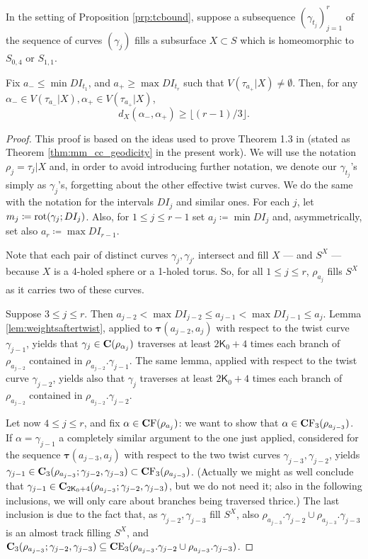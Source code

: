 \begin{lemma}\label{lem:tcboundsimplest}
In the setting of Proposition \ref{prp:tcbound}, suppose a subsequence $(\gamma_{t_j})_{j=1}^r$ of the sequence of curves $(\gamma_j)$ fills a subsurface $X\subset S$ which is homeomorphic to $S_{0,4}$ or $S_{1,1}$.

Fix $a_-\leq\min DI_{t_1}$, and $a_+\geq\max DI_{t_r}$ such that $V(\tau_{a_+}|X)\not=\emptyset$. Then, for any $\alpha_-\in V(\tau_{a_-}|X), \alpha_+\in V(\tau_{a_+}|X)$,
$$
d_X\left(\alpha_-,\alpha_+\right)\geq \lfloor (r-1)/3\rfloor.
$$
\end{lemma}
\begin{proof}
This proof is based on the ideas used to prove Theorem 1.3 in \cite{masurminskyq} (stated as Theorem \ref{thm:mm_cc_geodicity} in the present work). We will use the notation $\rho_j=\tau_j|X$ and, in order to avoid introducing further notation, we denote our $\gamma_{t_j}$'s simply as $\gamma_j$'s, forgetting about the other effective twist curves. We do the same with the notation for the intervals $DI_j$ and similar ones. For each $j$, let $m_j\coloneqq \mathrm{rot}(\gamma_j;DI_j)$. Also, for $1\leq j\leq r-1$ set $a_j\coloneqq\min DI_j$ and, asymmetrically, set also $a_r\coloneqq\max DI_{r-1}$.

Note that each pair of distinct curves $\gamma_j,\gamma_{j'}$ intersect and fill $X$ --- and $S^X$ --- because $X$ is a 4-holed sphere or a 1-holed torus. So, for all $1\leq j\leq r$, $\rho_{a_j}$ fills $S^X$ as it carries two of these curves.

Suppose $3\leq j \leq r$. Then $a_{j-2}<\max DI_{j-2}\leq a_{j-1}<\max DI_{j-1}\leq a_j$. Lemma \ref{lem:weightsaftertwist}, applied to $\bm\tau(a_{j-2},a_j)$ with respect to the twist curve $\gamma_{j-1}$, yields that $\gamma_j\in \mathbf C(\rho_{\alpha_j})$ traverses at least $2\mathsf{K}_0+4$ times each branch of $\rho_{a_{j-2}}$ contained in $\rho_{a_{j-2}}.\gamma_{j-1}$. The same lemma, applied with respect to the twist curve $\gamma_{j-2}$, yields also that $\gamma_j$ traverses at least $2\mathsf{K}_0+4$ times each branch of $\rho_{a_{j-2}}$ contained in $\rho_{a_{j-2}}.\gamma_{j-2}$.

Let now $4 \leq j \leq r$, and fix $\alpha\in \mathbf C \mathrm F(\rho_{a_j})$: we want to show that $\alpha\in \mathbf C \mathrm F_3(\rho_{a_{j-3}})$. If $\alpha=\gamma_{j-1}$ a completely similar argument to the one just applied, considered for the sequence $\bm\tau(a_{j-3}, a_j)$ with respect to the two twist curves $\gamma_{j-3},\gamma_{j-2}$, yields $\gamma_{j-1}\in \mathbf C_3(\rho_{a_{j-3}}; \gamma_{j-2},\gamma_{j-3})\subset\mathbf C \mathrm F_3(\rho_{a_{j-3}})$. (Actually we might as well conclude that $\gamma_{j-1}\in \mathbf C_{2\mathsf{K}_0+4}(\rho_{a_{j-3}}; \gamma_{j-2},\gamma_{j-3})$, but we do not need it; also in the following inclusions, we will only care about branches being traversed thrice.) The last inclusion is due to the fact that, as $\gamma_{j-2},\gamma_{j-3}$ fill $S^X$, also $\rho_{a_{j-3}}.\gamma_{j-2}\cup \rho_{a_{j-3}}.\gamma_{j-3}$ is an almost track filling $S^X$, and $\mathbf C_3(\rho_{a_{j-3}}; \gamma_{j-2},\gamma_{j-3})\subseteq \mathbf C \mathrm E_3(\rho_{a_{j-3}}.\gamma_{j-2}\cup \rho_{a_{j-3}}.\gamma_{j-3})$. 


\end{proof}
